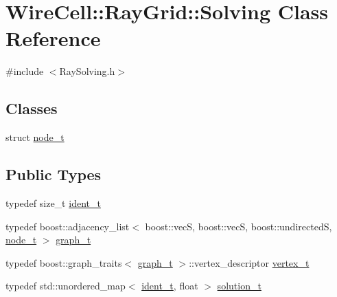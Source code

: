 \hypertarget{class_wire_cell_1_1_ray_grid_1_1_solving}{}\section{Wire\+Cell\+:\+:Ray\+Grid\+:\+:Solving Class Reference}
\label{class_wire_cell_1_1_ray_grid_1_1_solving}


{\ttfamily \#include $<$Ray\+Solving.\+h$>$}

\subsection*{Classes}
\begin{DoxyCompactItemize}
\item 
struct \hyperlink{struct_wire_cell_1_1_ray_grid_1_1_solving_1_1node__t}{node\+\_\+t}
\end{DoxyCompactItemize}
\subsection*{Public Types}
\begin{DoxyCompactItemize}
\item 
typedef size\+\_\+t \hyperlink{class_wire_cell_1_1_ray_grid_1_1_solving_af2a71a899a5b0daceaec23b9acf12b91}{ident\+\_\+t}
\item 
typedef boost\+::adjacency\+\_\+list$<$ boost\+::vecS, boost\+::vecS, boost\+::undirectedS, \hyperlink{struct_wire_cell_1_1_ray_grid_1_1_solving_1_1node__t}{node\+\_\+t} $>$ \hyperlink{class_wire_cell_1_1_ray_grid_1_1_solving_ac9cb5afd9b0590c4671a239347dc5e34}{graph\+\_\+t}
\item 
typedef boost\+::graph\+\_\+traits$<$ \hyperlink{class_wire_cell_1_1_ray_grid_1_1_solving_ac9cb5afd9b0590c4671a239347dc5e34}{graph\+\_\+t} $>$\+::vertex\+\_\+descriptor \hyperlink{class_wire_cell_1_1_ray_grid_1_1_solving_a2bd8328227317e855f9e382a4e7f3201}{vertex\+\_\+t}
\item 
typedef std\+::unordered\+\_\+map$<$ \hyperlink{class_wire_cell_1_1_ray_grid_1_1_solving_af2a71a899a5b0daceaec23b9acf12b91}{ident\+\_\+t}, float $>$ \hyperlink{class_wire_cell_1_1_ray_grid_1_1_solving_a51d0173e0e992f53ab92b27f72d65629}{solution\+\_\+t}
\end{DoxyCompactItemize}
